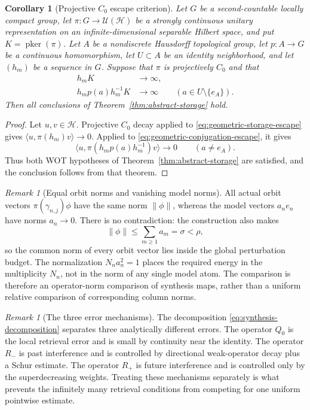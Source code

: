 \documentclass[reqno]{amsart}
\numberwithin{equation}{section}
\newtheorem{corollary}[theorem]{Corollary}
\theoremstyle{definition}
\theoremstyle{remark}
\newtheorem{remark}[theorem]{Remark}
\newcommand{\cH}{\mathcal H}
\newcommand{\U}{\mathcal U}
\newcommand{\pker}{\operatorname{pker}}
\begin{document}
\begin{corollary}[Projective $C_0$ escape criterion]
\label{cor:projective-storage}
Let $G$ be a second-countable locally compact group, let
$\pi:G\to\U(\cH)$ be a strongly continuous unitary representation on an
infinite-dimensional separable Hilbert space, and put $K=\pker(\pi)$.
Let $A$ be a nondiscrete Hausdorff topological group, let
$p:A\to G$ be a continuous homomorphism, let $U\subset A$ be an identity
neighborhood, and let $(h_m)$ be a sequence in $G$.  Suppose that $\pi$ is
projectively $C_0$ and that
\begin{align}
 h_mK&\longrightarrow\infty,                                      \label{eq:geometric-storage-escape}\\
 h_mp(a)h_m^{-1}K&\longrightarrow\infty
 \qquad(a\in U\setminus\{e_A\}).                                \label{eq:geometric-conjugation-escape}
\end{align}
Then all conclusions of Theorem~\ref{thm:abstract-storage} hold.
\end{corollary}

\begin{proof}
Let $u,v\in\cH$.  Projective $C_0$ decay applied to
\eqref{eq:geometric-storage-escape} gives
$\langle u,\pi(h_m)v\rangle\to0$.  Applied to
\eqref{eq:geometric-conjugation-escape}, it gives
\[
 \langle u,\pi(h_mp(a)h_m^{-1})v\rangle\longrightarrow0
 \qquad(a\neq e_A).
\]
Thus both WOT hypotheses of Theorem~\ref{thm:abstract-storage} are satisfied,
and the conclusion follows from that theorem.
\end{proof}

\begin{remark}[Equal orbit norms and vanishing model norms]
\label{rem:equal-norm-objection}
All actual orbit vectors $\pi(\gamma_{n,j})\phi$ have the same norm
$\|\phi\|$, whereas the model vectors $a_ne_n$ have norms $a_n\to0$.
There is no contradiction: the construction also makes
\[
 \|\phi\|\leq\sum_{m\geq1}a_m=\sigma<\rho,
\]
so the common norm of every orbit vector lies inside the global perturbation
budget.  The normalization $N_na_n^2=1$ places the required energy in the
multiplicity $N_n$, not in the norm of any single model atom.  The comparison
is therefore an operator-norm comparison of synthesis maps, rather than a
uniform relative comparison of corresponding column norms.
\end{remark}

\begin{remark}[The three error mechanisms]\label{rem:three-errors}
The decomposition \eqref{eq:synthesis-decomposition} separates three
analytically different errors.  The operator $Q_0$ is the local retrieval
error and is small by continuity near the identity.  The operator $R_-$ is
past interference and is controlled by directional weak-operator decay plus
a Schur estimate.  The operator $R_+$ is future interference and is controlled
only by the superdecreasing weights.  Treating these mechanisms separately
is what prevents the infinitely many retrieval conditions from competing for
one uniform pointwise estimate.
\end{remark}
\end{document}
